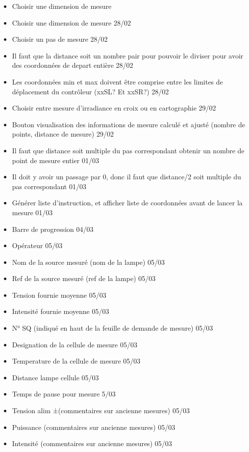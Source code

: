 \documentclass[a4paper, 12pt]{article}
\begin{document}
\begin{itemize}
	\item [ ] Choisir une dimension de mesure
	\item [ ] Choisir une dimension de mesure  28/02
	\item [ ] Choisir un pas de mesure  28/02
	\item [ ] Il faut que la distance soit un nombre pair pour pouvoir le diviser pour avoir des coordonnées de depart entière  28/02
	\item [ ] Les coordonnées min et max doivent être comprise entre les limites de déplacement du contrôleur (xxSL? Et xxSR?)  28/02
	\item [ ] Choisir entre mesure d'irradiance en croix ou en cartographie 29/02
	\item [ ] Bouton visualisation des informations de mesure calculé et ajusté (nombre de points, distance de mesure)  29/02
	\item [ ] Il faut que distance soit multiple du pas correspondant obtenir un nombre de point de mesure entier  01/03
	\item [ ] Il doit y avoir un passage par 0, donc il faut que distance/2 soit multiple du pas correspondant  01/03
	\item [ ] Générer liste d'instruction, et afficher liste de coordonnées avant de lancer la mesure  01/03
	\item [ ] Barre de progression  04/03
	\item [ ] Opérateur  05/03
	\item [ ] Nom de la source mesuré (nom de la lampe)  05/03
	\item [ ] Ref de la source mesuré (ref de la lampe)  05/03
	\item [ ] Tension fournie moyenne  05/03
	\item [ ] Intensité fournie moyenne  05/03
	\item [ ] N° SQ (indiqué en haut de la feuille de demande de mesure)  05/03
	\item [ ] Designation de la cellule de mesure  05/03
	\item [ ] Temperature de la cellule de mesure  05/03
	\item [ ] Distance lampe cellule  05/03 
	\item [ ] Temps de pause pour mesure  5/03
	\item [ ] Tension alim ±(commentaires sur ancienne mesures)  05/03
	\item [ ] Puissance (commentaires sur ancienne mesures)  05/03
	\item [ ] Intensité (commentaires sur ancienne mesures)  05/03

\end{itemize}
\end{document}
